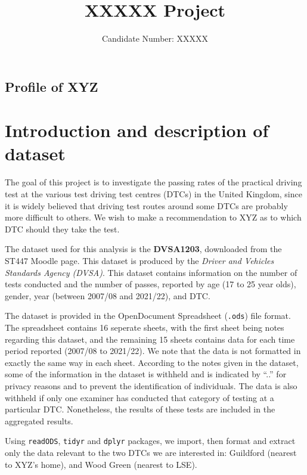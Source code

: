 \documentclass{article}
\title{XXXXX Project}
\author{Candidate Number: XXXXX}
\date{}
\begin{document}
\maketitle

\begin{singlespace}
\section*{Profile of XYZ}

\end{singlespace}

\section*{Introduction and description of dataset}
The goal of this project is to investigate the passing rates of the practical driving test at the various test driving test centres (DTCs) in the United Kingdom, since it is widely believed that driving test routes around some DTCs are probably more difficult to others. We wish to make a recommendation to XYZ as to which DTC should they take the test.

The dataset used for this analysis is the \textbf{DVSA1203}, downloaded from the ST447 Moodle page. This dataset is produced by the \textsl{Driver and Vehicles Standards Agency (DVSA)}. This dataset contains information on the number of tests conducted and the number of passes, reported by age (17 to 25 year olds), gender, year (between 2007/08 and 2021/22), and DTC. 

The dataset is provided in the OpenDocument Spreadsheet (\texttt{.ods}) file format. The spreadsheet contains 16 seperate sheets, with the first sheet being notes regarding this dataset, and the remaining 15 sheets contains data for each time period reported (2007/08 to 2021/22). We note that the data is not formatted in exactly the same way in each sheet. According to the notes given in the dataset, some of the information in the dataset is withheld and is indicated by ``..'' for privacy reasons and to prevent the identification of individuals. The data is also withheld if only one examiner has conducted that category of testing at a particular DTC. Nonetheless, the results of these tests are included in the aggregated results. 

Using \texttt{readODS}, \texttt{tidyr} and \texttt{dplyr} packages, we import, then format and extract only the data relevant to the two DTCs we are interested in: Guildford (nearest to XYZ's home), and Wood Green (nearest to LSE).
\end{document}
